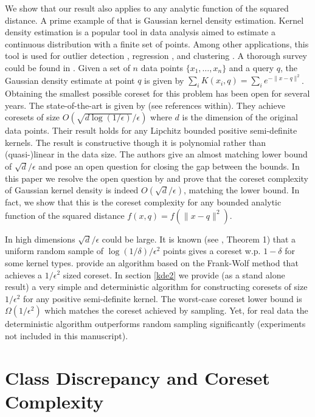 \documentclass[12pt]{colt2019} %
\newcommand{\eps}{\epsilon}
\begin{document}
We show that our result also applies to any analytic function of the squared distance.
A prime example of that is Gaussian kernel density estimation.
Kernel density estimation is a popular tool in data analysis aimed to estimate a continuous distribution with a finite set of points. 
Among other applications, this tool is used for outlier detection \cite{schubert2014generalized}, regression \cite{fan2018local}, and clustering \cite{rinaldo2010generalized}. 
A thorough survey could be found in \cite{silverman2018density}. 
Given a set of $n$ data points $\{x_1,\ldots,x_n\}$ and a query $q$, the Gaussian density estimate at point $q$ is given by $\sum_i K(x_i,q) = \sum_i e^{-\|x-q\|^2}$. 
Obtaining the smallest possible coreset for this problem has been open for several years.
The state-of-the-art is given by \cite{DBLP:journals/corr/abs-1802-01751} (see references within). 
They achieve coresets of size $O(\sqrt{d\log(1/\eps)}/\eps)$ where $d$ is the dimension of the original data points. 
Their result holds for any Lipchitz bounded positive semi-definite kernels. 
The result is constructive though it is polynomial rather than (quasi-)linear in the data size. 
The authors give an almost matching lower bound of $\sqrt{d}/\eps$ and pose an open question for closing the gap between the bounds. 
In this paper we resolve the open question by \cite{DBLP:journals/corr/abs-1802-01751} and prove that the coreset complexity of Gaussian kernel density is indeed $O(\sqrt{d}/\eps)$, matching the lower bound. 
In fact, we show that this is the coreset complexity for any bounded analytic function of the squared distance $f(x,q) = f(\|x-q\|^2)$.


In high dimensions $\sqrt{d}/\eps$ could be large. 
It is known (see \cite{lopez2015towards}, Theorem 1) that a uniform random sample of $\log(1/\delta)/\eps^2$ points gives a coreset w.p. $1-\delta$ for some kernel types. 
\cite{DBLP:journals/corr/abs-1802-01751} provide an algorithm based on the Frank-Wolf method that achieves a $1/\eps^2$ sized coreset. 
In section \ref{kde2} we provide (as a stand alone result) a very simple and deterministic algorithm for constructing coresets of size $1/\eps^2$ for any positive semi-definite kernel.  The worst-case coreset lower bound is $\Omega(1/\eps^2)$ which matches the coreset achieved by sampling. 
Yet, for real data the deterministic algorithm outperforms random sampling significantly (experiments not included in this manuscript).

\section{Class Discrepancy and Coreset Complexity}
\end{document}
